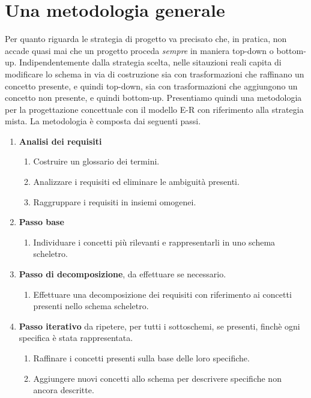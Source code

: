 \documentclass[12pt]{report}
\begin{document}
 	\section{Una metodologia generale}
 	Per quanto riguarda le strategia di progetto va precisato che, in pratica, non accade quasi mai che un progetto proceda \textit{sempre} in maniera top-down o bottom-up. Indipendentemente dalla strategia scelta, nelle sitauzioni reali capita di modificare lo schema in via di costruzione sia con trasformazioni che raffinano un concetto presente, e quindi top-down, sia con trasformazioni che aggiungono un concetto non presente, e quindi bottom-up. Presentiamo quindi una metodologia per la progettazione concettuale con il modello E-R con riferimento alla strategia mista. La metodologia è composta dai seguenti passi.
 	\begin{enumerate}
 		\item \textbf{Analisi dei requisiti}
 			\begin{enumerate}
 				\item Costruire un glossario dei termini.
 				\item Analizzare i requisiti ed eliminare le ambiguità presenti.
 				\item Raggruppare i requisiti in insiemi omogenei.
 			\end{enumerate}
 		\item \textbf{Passo base}
 		\begin{enumerate}
 			\item Individuare i concetti più rilevanti e rappresentarli in uno schema scheletro.
 		\end{enumerate}
 		\item \textbf{Passo di decomposizione}, da effettuare se necessario.
 		\begin{enumerate}
 			\item Effettuare una decomposizione dei requisiti con riferimento ai concetti presenti nello schema scheletro.
 		\end{enumerate}
 		\item \textbf{Passo iterativo} da ripetere, per tutti i sottoschemi, se presenti, finchè ogni specifica è stata rappresentata.
 		\begin{enumerate}
 			\item Raffinare i concetti presenti sulla base delle loro specifiche.
 			\item Aggiungere nuovi concetti allo schema per descrivere specifiche non ancora descritte.
 		\end{enumerate}

\end{enumerate}
\end{document}
